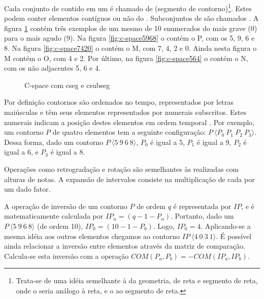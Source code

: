 Cada conjunto de  contido em um  é
chamado de  (segmento de contorno)\footnote{Trata-se de
  uma idéia semelhante à da geometria, de reta e segmento de reta,
  onde o  seria análogo à reta, e o  ao
  segmento de reta.}. Estes  podem conter elementos
contíguos ou não do . Subconjuntos de  são
chamados . A figura \ref{fig:c-space} contém três
exemplos de um mesmo  de 10  enumerados
do mais grave (0) para o mais agudo (9). Na figura
\ref{fig:c-space5968} o  contém o  P, com
os  5, 9, 6 e 8. Na figura \ref{fig:c-space7420} o
 contém o  M, com  7, 4, 2 e
0. Ainda nesta figura o  M contém o  O, com
 4 e 2. Por último, na figura \ref{fig:c-space564} o
 contém o  N, com os  não
adjacentes 5, 6 e 4.

\begin{figure}
  \centering
  \caption{C-space com cseg e csubseg}
  \label{fig:c-space}
\end{figure}

Por definição contornos são ordenados no tempo, representados por
letras maiúsculas e têm seus elementos representados por numerais
subscritos. Estes numerais indicam a posição destes elementos em ordem
temporal \cite{marvin.ea87:relating}. Por exemplo, um contorno $P$ de
quatro elementos tem a seguinte configuração: $P\:\langle
P_0\:P_1\:P_2\:P_3\rangle$. Dessa forma, dado um contorno
$P\:\langle5\:9\:6\:8\rangle$, $P_0$ é igual a 5, $P_1$ é igual a 9,
$P_2$ é igual a 6, e $P_3$ é igual a 8.

Operações como retrogradação e rotação são semelhantes às realizadas
com alturas de notas. A expansão de intervalos consiste na
multiplicação de cada  por um dado fator.

A operação de inversão de um contorno $P$ de ordem $q$ é representada
por $IP$, e é matematicamente calculada por
$IP_n=(q-1-P_n)$. Portanto, dado um 
$P\:\langle5\:9\:6\:8\rangle$ (de ordem 10), $IP_0=(10-1-P_0)$. Logo,
$IP_0=4$. Aplicando-se a mesma idéia aos outros elementos chegamos ao
contorno $IP\:\langle4\:0\:3\:1\rangle$. É possível ainda relacionar a
inversão entre elementos através da matriz de comparação. Calcula-se
esta inversão com a operação $COM(P_a,P_b)=-COM(IP_a,IP_b)$.


